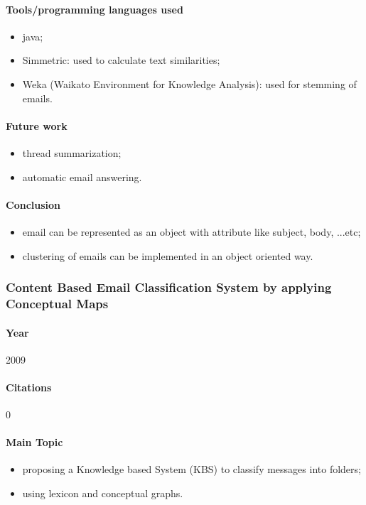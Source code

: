 \documentclass[12pt]{article}
\begin{document}
\paragraph{Tools/programming languages used}
\begin{itemize}
    \item java;
    \item Simmetric: used to calculate text similarities;
    \item Weka (Waikato Environment for Knowledge Analysis): used for stemming of emails.
\end{itemize}

\paragraph{Future work}
\begin{itemize}
    \item thread summarization;
    \item automatic email answering.
\end{itemize}

\paragraph{Conclusion}
\begin{itemize}
    \item email can be represented as an object with attribute like subject, body, ...etc;
    \item clustering of emails can be implemented in an object oriented way.
\end{itemize}



\subsubsection{Content Based Email Classification System by applying Conceptual Maps \cite{BASKARAN09}}

\paragraph{Year} 2009
\paragraph{Citations} 0

\paragraph{Main Topic}
\begin{itemize}
    \item proposing a Knowledge based System (KBS) to classify messages into folders;
    \item using lexicon and conceptual graphs.
\end{itemize}
\end{document}
